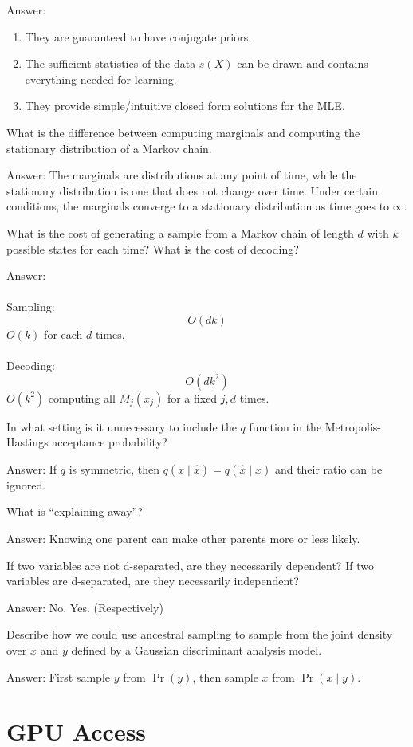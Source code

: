\documentclass{article}
\def\ans#1{\par\gre{Answer: #1}}
\def\gre#1{{\color{gre}#1}}
\def\cond{\; | \;}
\begin{document}
{\ans{
\begin{enumerate}
   \item They are guaranteed to have conjugate priors.
   \item The sufficient statistics of the data $s(X)$ can be drawn and contains everything needed for learning.
   \item They provide simple/intuitive closed form solutions for the MLE.
\end{enumerate}
}
\item What is the difference between computing marginals and computing the stationary distribution of a Markov chain.
\ans{
The marginals are distributions at any point of time, while the stationary distribution is one that does not change over time. Under certain conditions, the marginals converge to a stationary distribution as time goes to $\infty$.
}
\pagebreak
\item What is the cost of generating a sample from a Markov chain of length $d$ with $k$ possible states for each time? What is the cost of decoding?
\ans{\\\\
Sampling:
\[O(dk)\]
$O(k)$ for each $d$ times.\\\\
Decoding:
\[O(dk^2)\]
$O(k^2)$ computing all $M_j(x_j)$ for a fixed $j, d$ times.
}
\item In what setting is it unnecessary to include the $q$ function in the Metropolis-Hastings acceptance probability?
\ans{
If $q$ is symmetric, then $q(x \cond \hat{x})=q(\hat{x} \cond x)$ and their ratio can be ignored.
}
\item What is ``explaining away''?
\ans{
Knowing one parent can make other parents more or less likely.
}
\item If two variables are not d-separated, are they necessarily dependent? If two variables are d-separated, are they necessarily independent?
\ans{
No. Yes. (Respectively)
}
\item Describe how we could use ancestral sampling to sample from the joint density over $x$ and $y$ defined by a Gaussian discriminant analysis model.
\ans{
First sample $y$ from $\Pr(y)$, then sample $x$ from $\Pr(x\cond y)$.
}
}

\pagebreak

\section*{GPU Access}
\end{document}
